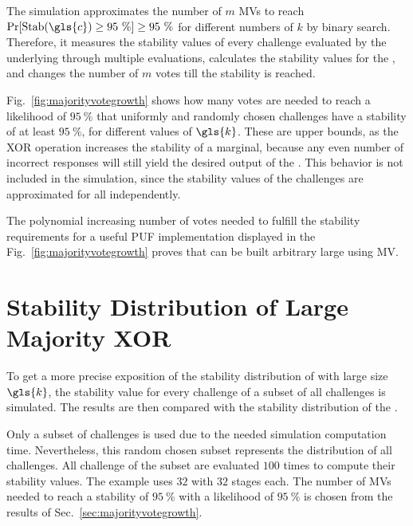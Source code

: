 The simulation approximates the number of $m$ \acp{MV} to reach $\Pr[\protect\Stab(\gls{c}) \ge 95\ \%] \ge 95\ \%$ for different numbers of $k$ by binary search.
Therefore, it measures the stability values of every challenge evaluated by the underlying \mpufs through multiple evaluations, calculates the stability values for the \mxpuf, and changes the number of $m$ votes till the stability is reached.

Fig.\ \ref{fig:majorityvotegrowth} shows how many votes are needed to reach a likelihood of $95\ \%$ that uniformly and randomly chosen challenges have a stability of at least $95\ \%$, for different values of $\gls{k}$.
These are upper bounds, as the \ac{XOR} operation increases the stability of a \xpuf marginal, because any even number of incorrect \apuf responses will still yield the desired output of the \xpuf. 
This behavior is not included in the simulation, since the stability values of the challenges are approximated for all \apufs independently.

The polynomial increasing number of votes needed to fulfill the stability requirements for a useful PUF implementation displayed in the Fig.\ \ref{fig:majorityvotegrowth} proves that \xpufs can be built arbitrary large using \ac{MV}.


\section{Stability Distribution of Large Majority \acs{XOR} \apufs}
\label{sec:distributionoflargemxpufs}

To get a more precise exposition of the stability distribution of \mxpufs with large size $\gls{k}$, the stability value for every challenge of a subset of all challenges is simulated.
The results are then compared with the stability distribution of the \apuf.

Only a subset of challenges is used due to the needed simulation computation time.
Nevertheless, this random chosen subset represents the distribution of all challenges. 
All challenge of the subset are evaluated $100$ times to compute their stability values.
The example uses $32$ \mpufs with $32$ stages each.
The number of \acp{MV} needed to reach a stability of $95\ \%$ with a likelihood of $95\ \%$ is chosen from the results of Sec.\ \ref{sec:majorityvotegrowth}.


